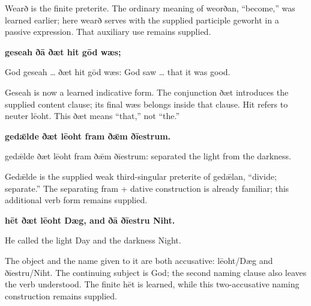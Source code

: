 Wearð is the finite preterite. The ordinary meaning of weorðan, “become,” was learned earlier; here wearð serves with the supplied participle geworht in a passive expression. That auxiliary use remains supplied.

\textbf{geseah ðā ðæt hit gōd wæs;}

God geseah … ðæt hit gōd wæs: God saw … that it was good.

Geseah is now a learned indicative form. The conjunction ðæt introduces the supplied content clause; its final wæs belongs inside that clause. Hit refers to neuter lēoht. This ðæt means “that,” not “the.”

\textbf{gedǣlde ðæt lēoht fram ðǣm ðīestrum.}

gedǣlde ðæt lēoht fram ðǣm ðīestrum: separated the light from the darkness.

Gedǣlde is the supplied weak third-singular preterite of gedǣlan, “divide; separate.” The separating fram + dative construction is already familiar; this additional verb form remains supplied.

\textbf{hēt ðæt lēoht Dæg, and ðā ðīestru Niht.}

He called the light Day and the darkness Night.

The object and the name given to it are both accusative: lēoht/\allowbreak{}Dæg and ðīestru/\allowbreak{}Niht. The continuing subject is God; the second naming clause also leaves the verb understood. The finite hēt is learned, while this two-accusative naming construction remains supplied.

